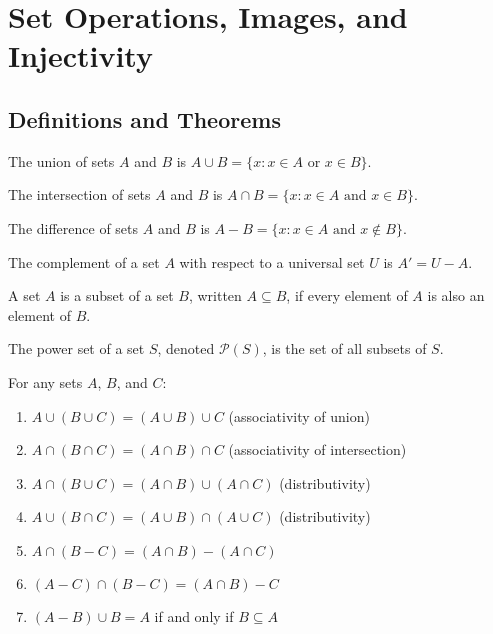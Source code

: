 \section{Set Operations, Images, and Injectivity}

\subsection*{Definitions and Theorems}

\begin{definition}[Union]
The union of sets $A$ and $B$ is $A \cup B = \{x : x \in A \text{ or } x \in B\}$.
\end{definition}

\begin{definition}[Intersection]
The intersection of sets $A$ and $B$ is $A \cap B = \{x : x \in A \text{ and } x \in B\}$.
\end{definition}

\begin{definition}
The difference of sets $A$ and $B$ is $A - B = \{x : x \in A \text{ and } x \notin B\}$.
\end{definition}

\begin{definition}[Complement]
The complement of a set $A$ with respect to a universal set $U$ is $A' = U - A$.
\end{definition}

\begin{definition}[Subset]
A set $A$ is a subset of a set $B$, written $A \subseteq B$, if every element of $A$ is also an element of $B$.
\end{definition}

\begin{definition}
The power set of a set $S$, denoted $\mathcal{P}(S)$, is the set of all subsets of $S$.
\end{definition}

\begin{theorem}
For any sets $A$, $B$, and $C$:
\begin{enumerate}
\item $A \cup (B \cup C) = (A \cup B) \cup C$ (associativity of union)
\item $A \cap (B \cap C) = (A \cap B) \cap C$ (associativity of intersection)
\item $A \cap (B \cup C) = (A \cap B) \cup (A \cap C)$ (distributivity)
\item $A \cup (B \cap C) = (A \cup B) \cap (A \cup C)$ (distributivity)
\item $A \cap (B - C) = (A \cap B) - (A \cap C)$
\item $(A - C) \cap (B - C) = (A \cap B) - C$
\item $(A - B) \cup B = A$ if and only if $B \subseteq A$
\end{enumerate}
\end{theorem}

